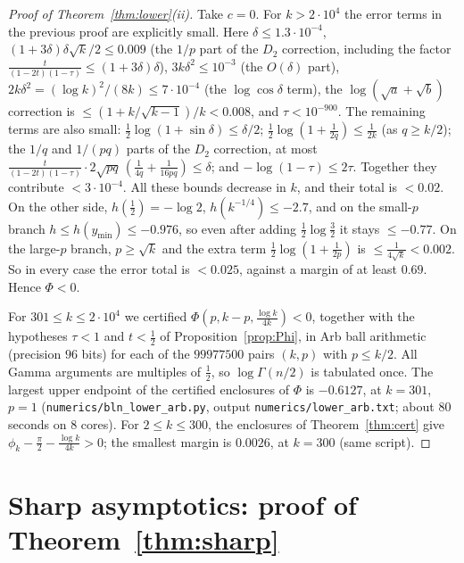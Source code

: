 \documentclass[11pt]{amsart}
\theoremstyle{definition}
\begin{document}
\begin{proof}[Proof of Theorem~\ref{thm:lower}(ii)]
Take $c=0$. For $k>2\cdot10^4$ the error terms in the previous proof are explicitly small. Here $\delta\le1.3\cdot10^{-4}$,
$(1+3\delta)\delta\sqrt k/2\le0.009$ (the $1/p$ part of the $D_2$ correction, including the factor $\frac t{(1-2t)(1-\tau)}\le(1+3\delta)\delta$),
$3k\delta^2\le10^{-3}$ (the $O(\delta)$ part),
$2k\delta^2=(\log k)^2/(8k)\le7\cdot10^{-4}$ (the $\log\cos\delta$ term), the $\log(\sqrt a+\sqrt b)$ correction is
$\le(1+k/\sqrt{k-1})/k<0.008$, and $\tau<10^{-900}$. The remaining terms are also small: $\frac12\log(1+\sin\delta)\le\delta/2$;
$\frac12\log(1+\frac1{2q})\le\frac1{2k}$ (as $q\ge k/2$); the $1/q$ and $1/(pq)$ parts of the $D_2$ correction, at most
$\frac{t}{(1-2t)(1-\tau)}\cdot2\sqrt{pq}\,(\frac1{4q}+\frac1{16pq})\le\delta$; and $-\log(1-\tau)\le2\tau$. Together they contribute $<3\cdot10^{-4}$.
All these bounds decrease in $k$, and their total is $<0.02$.
On the other side, $h(\frac12)=-\log2$, $h(k^{-1/4})\le-2.7$, and on the small-$p$ branch $h\le h(y_{\min})\le-0.976$, so even after
adding $\frac12\log\frac32$ it stays $\le-0.77$. On the large-$p$ branch, $p\ge\sqrt k$ and the extra term $\frac12\log(1+\frac1{2p})$ is
$\le\frac1{4\sqrt k}<0.002$. So in every case the error total is $<0.025$, against a margin of at least $0.69$. Hence $\Phi<0$.

For $301\le k\le2\cdot10^4$ we certified $\Phi(p,k-p,\frac{\log k}{4k})<0$, together with the hypotheses $\tau<1$ and $t<\frac12$ of
Proposition~\ref{prop:Phi}, in Arb ball arithmetic (precision $96$ bits) for each of the $99977500$ pairs $(k,p)$ with $p\le k/2$.
All Gamma arguments are multiples of $\frac12$, so $\log\Gamma(n/2)$ is tabulated once. The largest upper endpoint of the certified enclosures of $\Phi$ is
$-0.6127$, at $k=301$, $p=1$ (\texttt{numerics/bln\_lower\_arb.py}, output \texttt{numerics/lower\_arb.txt}; about $80$ seconds on $8$ cores).
For $2\le k\le300$, the enclosures of Theorem~\ref{thm:cert} give $\phi_k-\frac\pi2-\frac{\log k}{4k}>0$; the smallest margin is $0.0026$, at
$k=300$ (same script).
\end{proof}

\section{Sharp asymptotics: proof of Theorem~\ref{thm:sharp}}\label{sec:sharp}
\end{document}
